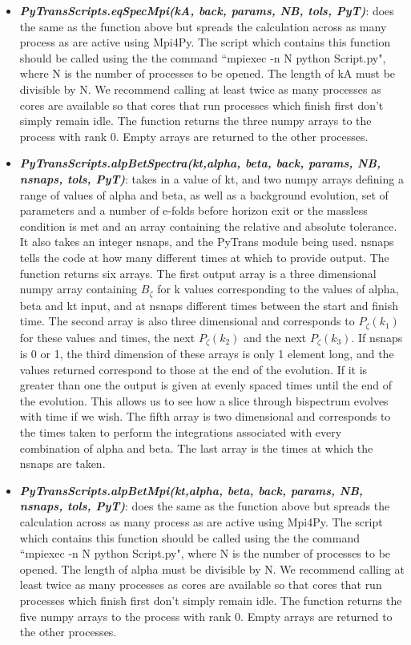 \documentclass[10pt,
amsmath,amssymb,
aps,prd,nofootinbib,eqsecnum,a4paper]{revtex4}
\begin{document}
\begin{itemize}
\item { \it \bf PyTransScripts.eqSpecMpi(kA, back, params, NB, tols, PyT)}: does the same as the function above but spreads the calculation across as many process as are active using Mpi4Py. The script which contains this function should be called using the the command ``mpiexec -n N python Script.py", where N is the number of processes to be opened. The length of kA must be divisible by N. We recommend calling at least twice as many processes as cores are available so that cores that run processes which finish first don't simply remain idle.  The function returns the three numpy arrays to the process with rank 0. Empty arrays are returned to the other processes. 


\item { \it \bf PyTransScripts.alpBetSpectra(kt,alpha, beta, back, params, NB, nsnaps, tols, PyT)}: takes in a value of kt, and two numpy  arrays defining a range of values of alpha and beta, as well as a background evolution, set of parameters and a number of e-folds before horizon exit or the massless condition is met and an array containing the relative and absolute tolerance. It also takes an integer nsnaps, and the PyTrans module being used. nsnaps  tells the code at how many different times at which to provide output. The function returns six arrays. 
The first output array is a three dimensional numpy array containing $B_\zeta$ for k values corresponding to the values of alpha, beta and kt  input, 
and at nsnaps different times between the start and finish time. The second array is also three dimensional and corresponds 
to $P_{\zeta}(k_1)$ for these values and times, the next $P_{\zeta}(k_2)$ and the next $P_{\zeta}(k_3)$. If nsnaps is 0 or 1, the third dimension of these arrays is only 1 element long, and the values returned correspond to those at the end of the evolution. If it is greater than one the output is given at evenly spaced times until the end of the evolution. This allows us to see how a slice through bispectrum evolves with time if we wish. 
The fifth array is two dimensional 
and corresponds to the times taken to perform the integrations associated with every combination of alpha and beta. The last array is the times at which 
the nsnaps are taken.

\item { \it \bf PyTransScripts.alpBetMpi(kt,alpha, beta, back, params, NB, nsnaps, tols, PyT)}: does the same as the function above but spreads the calculation across as many process as are active using Mpi4Py. The script which contains this function should be called using the the command ``mpiexec -n N python Script.py", where N is the number of processes to be opened. The length of alpha must be divisible by N. We recommend calling at least twice as many processes as cores are available so that cores that run processes which finish first don't simply remain idle.  The function returns the five numpy arrays to the process with rank 0. Empty arrays are returned to the other processes. 

\end{itemize}



\end{document}
